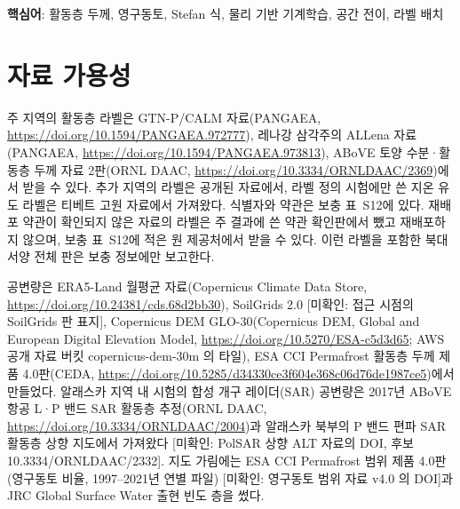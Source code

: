 \noindent\textbf{핵심어}: 활동층 두께, 영구동토, Stefan 식, 물리 기반 기계학습, 공간 전이, 라벨 배치
\fi

\ifnum{}\relax
\section*{자료 가용성}

주 지역의 활동층 라벨은 GTN-P/CALM 자료\cite{Streletskiy2025}(PANGAEA, \url{https://doi.org/10.1594/PANGAEA.972777}), 레나강 삼각주의 ALLena 자료\cite{Veremeeva2025}(PANGAEA, \url{https://doi.org/10.1594/PANGAEA.973813}), ABoVE 토양 수분·활동층 두께 자료 2판\cite{Moore2025}(ORNL DAAC, \url{https://doi.org/10.3334/ORNLDAAC/2369})에서 받을 수 있다. 추가 지역의 라벨은 공개된 자료\cite{DuE2026,Grosse2007,Palmtag2022,Talucci2024,Pohl2026,Makarieva2017,Liang2023,Walker2009,Scheer2024,Martin2023,Boike2024,Hammar2025,Zastruzny2024,Sannel2020}에서, 라벨 정의 시험에만 쓴 지온 유도 라벨은 티베트 고원 자료\cite{Fu2025}에서 가져왔다. 식별자와 약관은 보충 표~S12에 있다. 재배포 약관이 확인되지 않은 자료의 라벨은 주 결과에 쓴 약관 확인판에서 뺐고 재배포하지 않으며, 보충 표~S12에 적은 원 제공처에서 받을 수 있다. 이런 라벨을 포함한 북대서양 전체 판은 보충 정보에만 보고한다.

공변량은 ERA5-Land 월평균 자료\cite{munozsabater2021_era5_land}(Copernicus Climate Data Store, \url{https://doi.org/10.24381/cds.68d2bb30}), SoilGrids 2.0\cite{Poggio2021} [미확인: 접근 시점의 SoilGrids 판 표지], Copernicus DEM GLO-30(Copernicus DEM, Global and European Digital Elevation Model, \url{https://doi.org/10.5270/ESA-c5d3d65}; AWS 공개 자료 버킷 copernicus-dem-30m 의 타일), ESA CCI Permafrost 활동층 두께 제품 4.0판\cite{Westermann2024}(CEDA, \url{https://doi.org/10.5285/d34330ce3f604e368c06d76de1987ce5})에서 만들었다. 알래스카 지역 내 시험의 합성 개구 레이더(SAR) 공변량은 2017년 ABoVE 항공 L·P 밴드 SAR 활동층 추정(ORNL DAAC, \url{https://doi.org/10.3334/ORNLDAAC/2004})과 알래스카 북부의 P 밴드 편파 SAR 활동층 상향 지도\cite{Whitcomb2024}에서 가져왔다 [미확인: PolSAR 상향 ALT 자료의 DOI, 후보 10.3334/ORNLDAAC/2332]. 지도 가림에는 ESA CCI Permafrost 범위 제품 4.0판(영구동토 비율, 1997--2021년 연별 파일) [미확인: 영구동토 범위 자료 v4.0 의 DOI]과 JRC Global Surface Water 출현 빈도 층\cite{Pekel2016}을 썼다.

